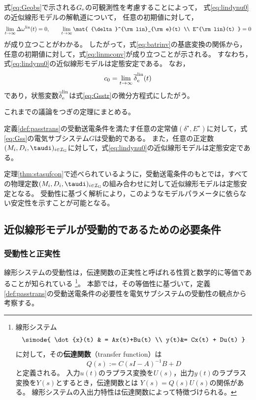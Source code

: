\documentclass[tombow,dvipdfmx]{corona-a5-1.1}
\begin{document}
式\ref{eq:Geobs}で示される$G_{\rm e}$の可観測性を考慮することによって，
式\ref{eq:lindynu0}の近似線形モデルの解軌道について，
任意の初期値に対して，
\begin{align}\label{eq:allzero}
\lim_{t\rightarrow \infty} \Delta \omega^{\rm lin}(t)  =0,\qquad
\lim_{t\rightarrow \infty} \mat{
{\delta}^{\rm lin}_{\rm e}(t)   \\
E^{\rm lin}(t)  
}
 =0
\end{align}
が成り立つことがわかる。
したがって，式\ref{eq:batrinv}の基底変換の関係から，任意の初期値に対して，式\ref{eq:linmconv}が成り立つことが示される。
すなわち，式\ref{eq:lindynu0}の近似線形モデルは定態安定である。
なお，
\[
c_0 = \lim_{t\rightarrow \infty}\overline{\delta}^{\rm lin}_{\rm e}(t)
\]
であり，状態変数$\overline{\delta}^{\rm lin}_{\rm e}$は式\ref{eq:Gsstr}の微分方程式にしたがう。

これまでの議論をつぎの定理にまとめる。

\begin{定理}[受動性に基づく近似線形モデルの定態安定性]\label{thm:stasufcon}
定義\ref{def:passtrans}の受動送電条件を満たす任意の定常値$(\delta^{\star},E^{\star})$に対して，式\ref{eq:Gss}の電気サブシステム$G$は受動的である。
また，任意の正定数$(M_i,D_i,\taudi )_{i \in \mathcal{I}_{\rm G}}$に対して，式\ref{eq:lindynu0}の近似線形モデルは定態安定である。
\end{定理}

定理\ref{thm:stasufcon}で述べられているように，受動送電条件のもとでは，すべての物理定数$(M_i,D_i,\taudi )_{i \in \mathcal{I}_{\rm G}}$の組み合わせに対して近似線形モデルは定態安定となる。
受動性に基づく解析により，このようなモデルパラメータに依らない安定性を示すことが可能となる。


\begin{例}[基底変換による定態安定性の解析]
\end{例}

\subsection{近似線形モデルが受動的であるための必要条件\advanced}\label{sec:nesconana}

\subsubsection{受動性と正実性}

線形システムの受動性は，伝達関数の正実性と呼ばれる性質と数学的に等価であることが知られている
\footnote{
線形システム
\begin{align*}
\simode{
\dot{x}(t) & = Ax(t)+Bu(t) \\
y(t)&= Cx(t) + Du(t)
}
\end{align*}
に対して，その\textbf{伝達関数}（transfer function）は
\[
Q(s):=C(sI-A)^{-1}B +D
\]
と定義される。
入力$u(t)$のラプラス変換を$U(s)$，出力$y(t)$のラプラス変換を$Y(s)$とするとき，伝達関数とは
$Y(s)=Q(s)U(s)$の関係がある。
線形システムの入出力特性は伝達関数によって特徴づけられる。
}。
本節では，その等価性に基づいて，定義\ref{def:passtrans}の受動送電条件の必要性を電気サブシステムの受動性の観点から考察する。
\end{document}
